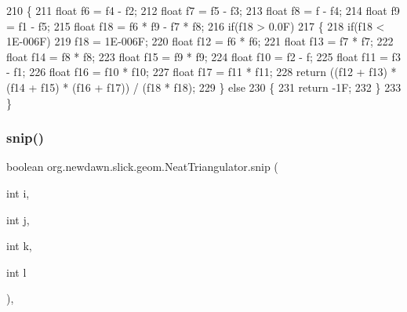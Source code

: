\begin{DoxyCode}
210     \{
211         \textcolor{keywordtype}{float} f6 = f4 - f2;
212         \textcolor{keywordtype}{float} f7 = f5 - f3;
213         \textcolor{keywordtype}{float} f8 = f - f4;
214         \textcolor{keywordtype}{float} f9 = f1 - f5;
215         \textcolor{keywordtype}{float} f18 = f6 * f9 - f7 * f8;
216         \textcolor{keywordflow}{if}(f18 > 0.0F)
217         \{
218             \textcolor{keywordflow}{if}(f18 < 1E-006F)
219                 f18 = 1E-006F;
220             \textcolor{keywordtype}{float} f12 = f6 * f6;
221             \textcolor{keywordtype}{float} f13 = f7 * f7;
222             \textcolor{keywordtype}{float} f14 = f8 * f8;
223             \textcolor{keywordtype}{float} f15 = f9 * f9;
224             \textcolor{keywordtype}{float} f10 = f2 - f;
225             \textcolor{keywordtype}{float} f11 = f3 - f1;
226             \textcolor{keywordtype}{float} f16 = f10 * f10;
227             \textcolor{keywordtype}{float} f17 = f11 * f11;
228             \textcolor{keywordflow}{return} ((f12 + f13) * (f14 + f15) * (f16 + f17)) / (f18 * f18);
229         \} \textcolor{keywordflow}{else}
230         \{
231             \textcolor{keywordflow}{return} -1F;
232         \}
233     \}
\end{DoxyCode}
\mbox{\label{classorg_1_1newdawn_1_1slick_1_1geom_1_1_neat_triangulator_ae7609b9e246ca3e4c4716d89c4a8a66f}} 
\subsubsection{\texorpdfstring{snip()}{snip()}}
{\footnotesize\ttfamily boolean org.\+newdawn.\+slick.\+geom.\+Neat\+Triangulator.\+snip (\begin{DoxyParamCaption}\item[{int}]{i,  }\item[{int}]{j,  }\item[{int}]{k,  }\item[{int}]{l }\end{DoxyParamCaption})\hspace{0.3cm}{\ttfamily [inline]}, {\ttfamily [private]}}

